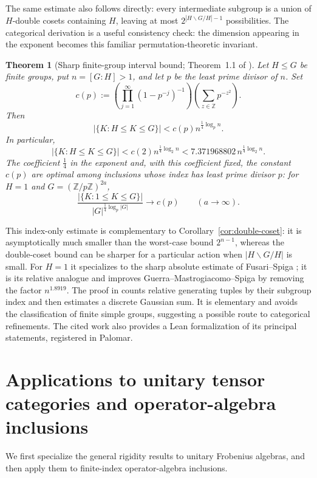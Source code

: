 \documentclass[11pt]{amsart}
\newtheorem{theorem}{Theorem}[section]
\theoremstyle{definition}
\theoremstyle{remark}
\begin{document}
The same estimate also follows directly: every intermediate subgroup is a
union of $H$-double cosets containing $H$, leaving at most
$2^{|H\backslash G/H|-1}$ possibilities.  The categorical derivation is a
useful consistency check: the dimension appearing in the exponent becomes
this familiar permutation-theoretic invariant.

\begin{theorem}[Sharp finite-group interval bound; Theorem~1.1 of
\cite{PalcouxSharpIntervals}]
\label{thm:sharp-group-interval-bound}
Let $H\leq G$ be finite groups, put $n=[G:H]>1$, and let $p$ be the least
prime divisor of $n$.  Set
\[
 c(p):=
 \left(\prod_{j=1}^{\infty}(1-p^{-j})^{-1}\right)
 \left(\sum_{z\in\mathbb Z}p^{-z^2}\right).
\]
Then
\[
 \bigl|\{K:H\leq K\leq G\}\bigr|
 <c(p)n^{\frac14\log_p n}.
\]
In particular,
\[
 \bigl|\{K:H\leq K\leq G\}\bigr|
 <c(2)n^{\frac14\log_2 n}
 <7.371968802\,n^{\frac14\log_2 n}.
\]
The coefficient $\frac14$ in the exponent and, with this coefficient fixed,
the constant $c(p)$ are optimal among inclusions whose index has least
prime divisor $p$: for $H=1$ and $G=(\mathbb Z/p\mathbb Z)^{2a}$,
\[
 \frac{\bigl|\{K:1\leq K\leq G\}\bigr|}
 {|G|^{\frac14\log_p|G|}}\longrightarrow c(p)
 \qquad(a\longrightarrow\infty).
\]
\end{theorem}

This index-only estimate is complementary to
Corollary~\ref{cor:double-coset}: it is asymptotically much smaller than the
worst-case bound $2^{n-1}$, whereas the double-coset bound can be sharper for
a particular action when $|H\backslash G/H|$ is small.  For $H=1$ it
specializes to the sharp absolute estimate of Fusari--Spiga
\cite{FusariSpiga}; it is its relative analogue and improves
Guerra--Mastrogiacomo--Spiga \cite{GuerraMastrogiacomoSpiga} by removing the
factor $n^{1.8919}$.  The proof in \cite{PalcouxSharpIntervals} counts relative generating
tuples by their subgroup index and then estimates a discrete Gaussian sum.
It is elementary and avoids the classification of finite simple groups,
suggesting a possible route to categorical refinements.  The cited work also provides a Lean formalization of its principal
statements, registered in Palomar.

\section{Applications to unitary tensor categories and operator-algebra
inclusions}\label{sec:subfactors}

We first specialize the general rigidity results to unitary Frobenius
algebras, and then apply them to finite-index operator-algebra inclusions.
\end{document}
